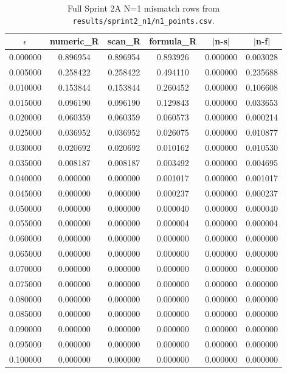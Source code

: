 \documentclass[a4paper,twocolumn,11pt,unpublished]{quantumarticle}
\begin{document}
\begin{table}[p]
\centering
\scriptsize
\caption{Full Sprint 2A N=1 mismatch rows from
\texttt{results/sprint2\_n1/n1\_points.csv}.}
\label{tab:n1-theorem-grid-full-appendix}
\begin{tabular}{cccccc}
\hline
$\epsilon$ & numeric\_R & scan\_R & formula\_R & $|$n-s$|$ & $|$n-f$|$ \\
\hline
0.000000 & 0.896954 & 0.896954 & 0.893926 & 0.000000 & 0.003028 \\
0.005000 & 0.258422 & 0.258422 & 0.494110 & 0.000000 & 0.235688 \\
0.010000 & 0.153844 & 0.153844 & 0.260452 & 0.000000 & 0.106608 \\
0.015000 & 0.096190 & 0.096190 & 0.129843 & 0.000000 & 0.033653 \\
0.020000 & 0.060359 & 0.060359 & 0.060573 & 0.000000 & 0.000214 \\
0.025000 & 0.036952 & 0.036952 & 0.026075 & 0.000000 & 0.010877 \\
0.030000 & 0.020692 & 0.020692 & 0.010162 & 0.000000 & 0.010530 \\
0.035000 & 0.008187 & 0.008187 & 0.003492 & 0.000000 & 0.004695 \\
0.040000 & 0.000000 & 0.000000 & 0.001017 & 0.000000 & 0.001017 \\
0.045000 & 0.000000 & 0.000000 & 0.000237 & 0.000000 & 0.000237 \\
0.050000 & 0.000000 & 0.000000 & 0.000040 & 0.000000 & 0.000040 \\
0.055000 & 0.000000 & 0.000000 & 0.000004 & 0.000000 & 0.000004 \\
0.060000 & 0.000000 & 0.000000 & 0.000000 & 0.000000 & 0.000000 \\
0.065000 & 0.000000 & 0.000000 & 0.000000 & 0.000000 & 0.000000 \\
0.070000 & 0.000000 & 0.000000 & 0.000000 & 0.000000 & 0.000000 \\
0.075000 & 0.000000 & 0.000000 & 0.000000 & 0.000000 & 0.000000 \\
0.080000 & 0.000000 & 0.000000 & 0.000000 & 0.000000 & 0.000000 \\
0.085000 & 0.000000 & 0.000000 & 0.000000 & 0.000000 & 0.000000 \\
0.090000 & 0.000000 & 0.000000 & 0.000000 & 0.000000 & 0.000000 \\
0.095000 & 0.000000 & 0.000000 & 0.000000 & 0.000000 & 0.000000 \\
0.100000 & 0.000000 & 0.000000 & 0.000000 & 0.000000 & 0.000000 \\

\end{tabular}
\end{table}
\end{document}
